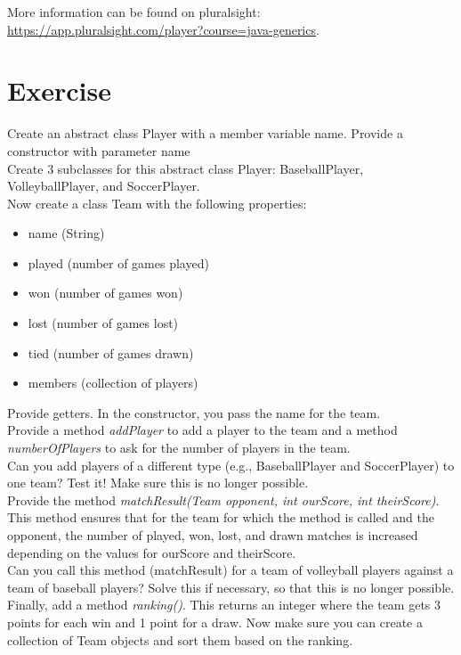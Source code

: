 \begin{remark}
More information can be found on pluralsight: \url{https://app.pluralsight.com/player?course=java-generics}. 
\end{remark}


\section{Exercise}

\begin{oefening}
Create an abstract class Player with a member variable name. Provide a constructor with  parameter name
\\
Create 3 subclasses for this abstract class Player: BaseballPlayer, VolleyballPlayer, and SoccerPlayer.
\\
Now create a class Team with the following properties:
\\
\begin{itemize}
\item name (String)
\item played (number of games played)
\item won (number of games won)
\item lost (number of games lost)
\item tied (number of games drawn)
\item members (collection of players)
\end{itemize}

Provide getters.  In the constructor,  you pass the name for the team.
\\

Provide a method \textit{addPlayer} to add a player to the team and a method \textit{numberOfPlayers} to ask for the number of players in the team.
\\
Can you add players of a different type (e.g., BaseballPlayer and SoccerPlayer) to one team? Test it! Make sure this is no longer possible.
\\
Provide the method \textit{matchResult(Team opponent, int ourScore, int theirScore)}. This method ensures that for the team for which the method is called and the opponent, the number of played, won, lost, and drawn matches is increased depending on the values for ourScore and theirScore.
\\
Can you call this method (matchResult) for a team of volleyball players against a team of baseball players? Solve this if necessary, so that this is no longer possible.
\\
Finally, add a method \textit{ranking()}. This returns an integer where the team gets 3 points for each win and 1 point for a draw. Now make sure you can create a collection of Team objects and sort them based on the ranking.
\end{oefening}



